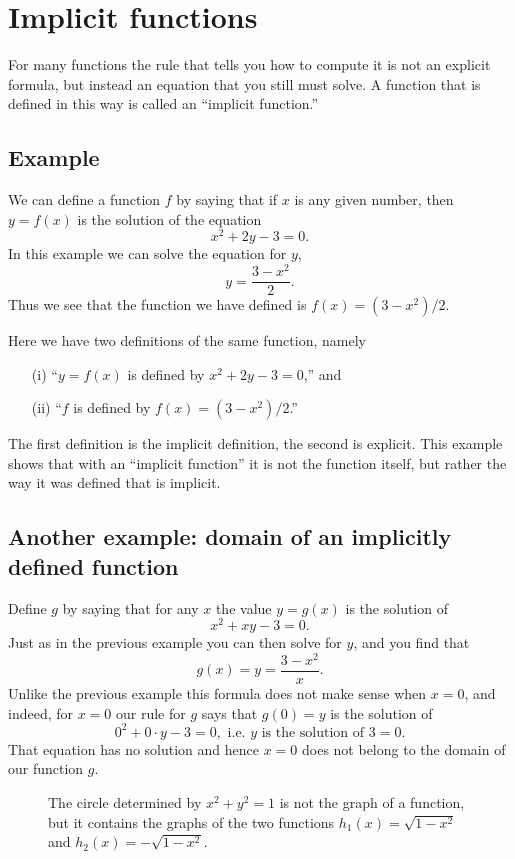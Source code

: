 \section{Implicit functions}
For many functions the rule that tells you how to compute it is not an explicit
formula, but instead an equation that you still must solve.  A function that is
defined in this way is called an ``implicit function.''  

\subsection{Example}
We can define a function $f$ by saying that if $x$ is any given number,
then $y = f(x)$ is the solution of the equation
\[
x^2+2y-3=0.
\]
In this example we can solve the equation for $y$, 
\[
y = \frac{3-x^2}2.
\]
Thus we see that the function we have defined is $f(x) = (3-x^2)/2$.

Here we have two definitions of the same function, namely
\begin{itemize}
\item [(i)] ``$y=f(x)$ is defined by $x^2+2y-3=0$,'' and
\item [(ii)] ``$f$ is defined by $f(x) = (3-x^2)/2$.''
\end{itemize}
The first definition is the implicit definition, the second is explicit.
This example shows that with an ``implicit function'' it is not the
function itself, but rather the way it was defined that is implicit.

\subsection{Another example: domain of an implicitly defined function}
Define $g$ by saying that for any $x$ the value $y=g(x)$ is the
solution of
\[
x^2+xy-3=0.
\]
Just as in the previous example you can then solve for $y$, and you
find that
\[
g(x) = y = \frac{3-x^2}x.
\]
Unlike the previous example this formula does not make sense when $x=0$, and
indeed, for $x=0$ our rule for $g$ says that $g(0) = y$ is the solution of 
\[
0^2+0\cdot y-3=0, \text{ i.e. $y$ is the solution of }3=0.
\]
That equation has no solution and hence $x=0$ does not belong to the domain
of our function $g$.  

\begin{figure}[h]
  \centering
  
  \caption{The circle determined by $x^2+y^2=1$ is not the graph of a
    function, but it contains the graphs of the two functions
    $h_1(x) = \sqrt{1-x^2}$ and $h_2(x)= -\sqrt{1-x^2}$.}
  \label{fig:01circle}
\end{figure}

